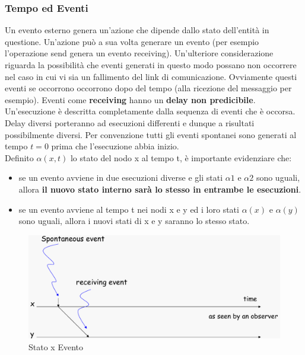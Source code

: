 \documentclass[12pt]{article}
\begin{document}
	\subsubsection{Tempo ed Eventi}
		Un evento esterno genera un'azione che dipende dallo stato dell'entità in questione. Un'azione può a sua volta generare un evento (per esempio l'operazione send genera un evento receiving). Un'ulteriore considerazione riguarda la possibilità che eventi generati in questo modo possano non occorrere nel caso in cui vi sia un fallimento del link di comunicazione. Ovviamente questi eventi se occorrono occorrono dopo del tempo (alla ricezione del messaggio per esempio). Eventi come \textbf{receiving} hanno un \textbf{delay non predicibile}. Un'esecuzione è descritta completamente dalla sequenza di eventi che è occorsa. Delay diversi porteranno ad esecuzioni differenti e dunque a risultati possibilmente diversi. Per convenzione tutti gli eventi spontanei sono generati al tempo $t=0$ prima che l'esecuzione abbia inizio.\\
		Definito $\alpha(x,t)$ lo stato del nodo x al tempo t, è importante evidenziare che:
		\begin{itemize}
			\item se un evento avviene in due esecuzioni diverse e gli stati $\alpha 1$ e $\alpha 2$ sono uguali, allora \textbf{il nuovo stato interno sarà lo stesso in entrambe le esecuzioni}.
			\item se un evento avviene al tempo t nei nodi x e y ed i loro stati $\alpha(x)$ e $\alpha(y)$ sono uguali, allora i nuovi stati di x e y saranno lo stesso stato.
		\end{itemize}
		
		
		\begin{figure}[h!]
			\centering
			\includegraphics[scale=0.25]{img/event.png}
			\caption{Stato x Evento}
		\end{figure}
	
\end{document}
